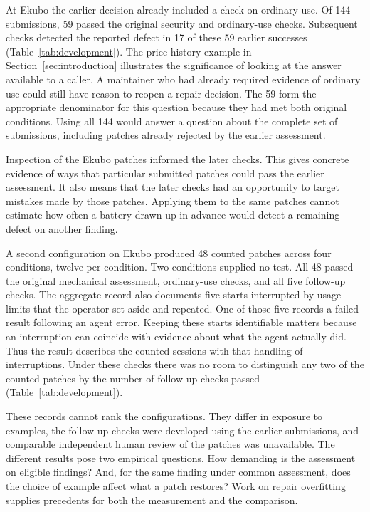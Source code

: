 At Ekubo the earlier decision already included a check on ordinary use. Of 144 submissions, 59 passed the original security and ordinary-use checks. Subsequent checks detected the reported defect in 17 of these 59 earlier successes (Table~\ref{tab:development}). The price-history example in Section~\ref{sec:introduction} illustrates the significance of looking at the answer available to a caller. A maintainer who had already required evidence of ordinary use could still have reason to reopen a repair decision. The 59 form the appropriate denominator for this question because they had met both original conditions. Using all 144 would answer a question about the complete set of submissions, including patches already rejected by the earlier assessment.

Inspection of the Ekubo patches informed the later checks. This gives concrete evidence of ways that particular submitted patches could pass the earlier assessment. It also means that the later checks had an opportunity to target mistakes made by those patches. Applying them to the same patches cannot estimate how often a battery drawn up in advance would detect a remaining defect on another finding.

A second configuration on Ekubo produced 48 counted patches across four conditions, twelve per condition. Two conditions supplied no test. All 48 passed the original mechanical assessment, ordinary-use checks, and all five follow-up checks. The aggregate record also documents five starts interrupted by usage limits that the operator set aside and repeated. One of those five records a failed result following an agent error. Keeping these starts identifiable matters because an interruption can coincide with evidence about what the agent actually did. Thus the result describes the counted sessions with that handling of interruptions. Under these checks there was no room to distinguish any two of the counted patches by the number of follow-up checks passed (Table~\ref{tab:development}).

These records cannot rank the configurations. They differ in exposure to examples, the follow-up checks were developed using the earlier submissions, and comparable independent human review of the patches was unavailable. The different results pose two empirical questions. How demanding is the assessment on eligible findings? And, for the same finding under common assessment, does the choice of example affect what a patch restores? Work on repair overfitting supplies precedents for both the measurement and the comparison.~\cite{smith2015overfitting,motwani2022quality}
